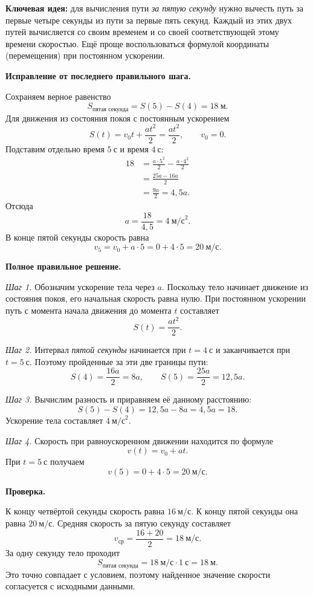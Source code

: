 \documentclass[12pt,a4paper]{article}
\begin{document}
\textcolor{blue!60!black}{\textbf{Ключевая идея:}} для вычисления пути \emph{за пятую секунду} нужно вычесть путь за первые четыре секунды из пути за первые пять секунд. Каждый из этих двух путей вычисляется со своим временем и со своей соответствующей этому времени скоростью. Ещё проще воспользоваться формулой координаты (перемещения) при постоянном ускорении.

\textbf{Исправление от последнего правильного шага.}

Сохраняем верное равенство
\[
S_{\text{пятая секунда}}=S(5)-S(4)=18\ \text{м}.
\]
Для движения из состояния покоя с постоянным ускорением
\[
S(t)=v_0t+\frac{at^2}{2}=\frac{at^2}{2},
\qquad v_0=0.
\]
Подставим отдельно время $5\ \text{с}$ и время $4\ \text{с}$:
\[
\begin{aligned}
18&=\frac{a\cdot5^2}{2}-\frac{a\cdot4^2}{2}\\
&=\frac{25a-16a}{2}\\
&=\frac{9a}{2}=4{,}5a.
\end{aligned}
\]
Отсюда
\[
a=\frac{18}{4{,}5}=4\ \text{м/с}^2.
\]
В конце пятой секунды скорость равна
\[
v_5=v_0+a\cdot5=0+4\cdot5
=\boxed{20\ \text{м/с}}.
\]

\textbf{Полное правильное решение.}

\emph{Шаг 1.} Обозначим ускорение тела через $a$. Поскольку тело начинает движение из состояния покоя, его начальная скорость равна нулю. При постоянном ускорении путь с момента начала движения до момента $t$ составляет
\[
S(t)=\frac{at^2}{2}.
\]

\emph{Шаг 2.} Интервал \emph{пятой секунды} начинается при $t=4\ \text{с}$ и заканчивается при $t=5\ \text{с}$. Поэтому пройденные за эти две границы пути:
\[
S(4)=\frac{16a}{2}=8a,
\qquad
S(5)=\frac{25a}{2}=12{,}5a.
\]

\emph{Шаг 3.} Вычислим разность и приравняем её данному расстоянию:
\[
S(5)-S(4)=12{,}5a-8a=4{,}5a=18.
\]
Ускорение тела составляет $4\ \text{м/с}^2$.

\emph{Шаг 4.} Скорость при равноускоренном движении находится по формуле
\[
v(t)=v_0+at.
\]
При $t=5\ \text{с}$ получаем
\[
v(5)=0+4\cdot5=20\ \text{м/с}.
\]

\textbf{Проверка.}

К концу четвёртой секунды скорость равна $16\ \text{м/с}$. К концу пятой секунды она равна $20\ \text{м/с}$. Средняя скорость за пятую секунду составляет
\[
v_{\text{ср}}=\frac{16+20}{2}=18\ \text{м/с}.
\]
За одну секунду тело проходит
\[
S_{\text{пятая секунда}}=18\ \text{м/с}\cdot1\ \text{с}=18\ \text{м}.
\]
Это точно совпадает с условием, поэтому найденное значение скорости согласуется с исходными данными.
\end{document}
